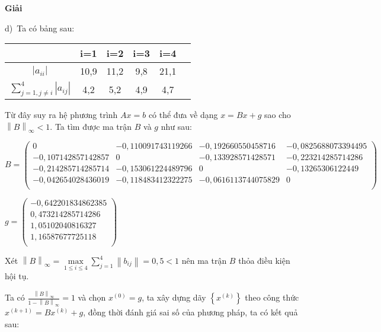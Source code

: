 \textbf{Giải}\par

d)~Ta có bảng sau:
\begin{longtable}{|Sc|c|c|c|c|}\hline
&i=1&i=2&i=3&i=4\\ \hline
\endhead
$\left|a_{ii} \right|$&10,9&11,2&9,8&21,1\\ \hline
$\sum\limits_{j=1, j\neq i}^{4} \left|a_{ij}\right|$&4,2&5,2&4,9&4,7\\ \hline
\end{longtable}

Từ đây suy ra hệ phương trình $Ax=b$ có thể đưa về dạng $x=Bx+g$ sao cho $\left\|B\right\|_{\infty} <1$.
Ta tìm được ma trận $B$ và $g$ như sau:\\
\begin{small}
$B=\begin{pmatrix}
0&-0,110091743119266&-0,192660550458716&-0,0825688073394495\\
-0,107142857142857&0&-0,133928571428571&-0,223214285714286\\
-0,214285714285714&-0,153061224489796&0&-0,13265306122449\\
-0,042654028436019&-0,118483412322275&-0,0616113744075829&0\\
\end{pmatrix}$
\end{small}
$g=\begin{pmatrix}
-0,642201834862385\\
0,473214285714286\\
1,05102040816327\\
1,16587677725118\\
\end{pmatrix}$\par

Xét $\left\|B \right\|_{\infty} =\underset{1\leqslant i \leqslant 4}\max \sum\limits_{j=1}^{4}{\left\|b_{ij}\right\|}= 0,5<1$ nên ma trận $B$ thỏa điều kiện hội tụ.\par

Ta có $\frac{\left\|B\right\|_{\infty} }{ 1-\left\|B\right\|_{\infty }}= 1$ và chọn $x^{(0)}=g$, ta xây dựng dãy $\left\{x^{(k)}\right\}$ theo công thức $x^{(k+1)}=Bx^{(k)}+g $, đồng thời đánh giá sai số của phương pháp, ta có kết quả sau:

